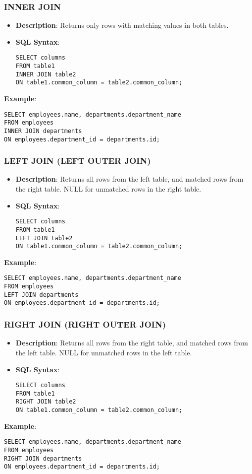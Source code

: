 \documentclass[aspectratio=169]{beamer}
\begin{document}
\begin{frame}[fragile]
    \frametitle{INNER JOIN}
    \begin{itemize}
        \item \textbf{Description}: Returns only rows with matching values in both tables.
        \item \textbf{SQL Syntax}:
        \begin{lstlisting}
SELECT columns
FROM table1
INNER JOIN table2
ON table1.common_column = table2.common_column;
        \end{lstlisting}
    \end{itemize}
    \textbf{Example}:
    \begin{lstlisting}
SELECT employees.name, departments.department_name
FROM employees
INNER JOIN departments
ON employees.department_id = departments.id;
    \end{lstlisting}
\end{frame}

\begin{frame}[fragile]
    \frametitle{LEFT JOIN (LEFT OUTER JOIN)}
    \begin{itemize}
        \item \textbf{Description}: Returns all rows from the left table, and matched rows from the right table. NULL for unmatched rows in the right table.
        \item \textbf{SQL Syntax}:
        \begin{lstlisting}
SELECT columns
FROM table1
LEFT JOIN table2
ON table1.common_column = table2.common_column;
        \end{lstlisting}
    \end{itemize}
    \textbf{Example}:
    \begin{lstlisting}
SELECT employees.name, departments.department_name
FROM employees
LEFT JOIN departments
ON employees.department_id = departments.id;
    \end{lstlisting}
\end{frame}

\begin{frame}[fragile]
    \frametitle{RIGHT JOIN (RIGHT OUTER JOIN)}
    \begin{itemize}
        \item \textbf{Description}: Returns all rows from the right table, and matched rows from the left table. NULL for unmatched rows in the left table.
        \item \textbf{SQL Syntax}:
        \begin{lstlisting}
SELECT columns
FROM table1
RIGHT JOIN table2
ON table1.common_column = table2.common_column;
        \end{lstlisting}
    \end{itemize}
    \textbf{Example}:
    \begin{lstlisting}
SELECT employees.name, departments.department_name
FROM employees
RIGHT JOIN departments
ON employees.department_id = departments.id;
    \end{lstlisting}
\end{frame}
\end{document}
